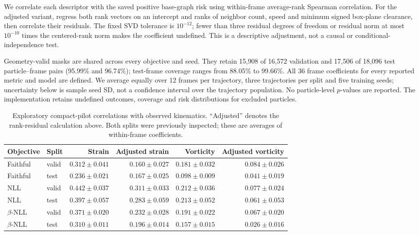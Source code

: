 We correlate each descriptor with the saved positive base-graph risk using
within-frame average-rank Spearman correlation. For the adjusted variant,
regress both rank vectors on an intercept and ranks of neighbor count,
speed and minimum signed box-plane clearance, then correlate their residuals.
The fixed SVD tolerance is $10^{-12}$; fewer than three residual degrees of
freedom or residual norm at most $10^{-10}$ times the centered-rank norm
makes the coefficient undefined. This is a descriptive adjustment, not a
causal or conditional-independence test.

Geometry-valid masks are shared across every objective and seed. They retain
15,908 of 16,572 validation and 17,506 of 18,096 test particle--frame pairs
(95.99\% and 96.74\%); test-frame coverage ranges from 88.05\% to 99.66\%.
All 36 frame coefficients for every reported metric and model are defined.
We average equally over 12 frames per trajectory, three trajectories per
split and five training seeds; uncertainty below is sample seed SD, not a
confidence interval over the trajectory population. No particle-level
$p$-values are reported. The implementation retains undefined outcomes,
coverage and risk distributions for excluded particles.

\begin{table}[ht]
\centering\small
\caption{Exploratory compact-pilot correlations with observed kinematics.
``Adjusted'' denotes the rank-residual calculation above. Both splits were
previously inspected; these are averages of within-frame coefficients.}
\label{tab:physical-rank}
\begin{tabular}{llrrrr}
\toprule
Objective & Split & Strain & Adjusted strain & Vorticity & Adjusted vorticity\\
\midrule
Faithful & valid & $0.312\pm0.041$ & $0.160\pm0.027$ & $0.181\pm0.032$ & $0.084\pm0.026$\\
Faithful & test & $0.236\pm0.021$ & $0.167\pm0.025$ & $0.098\pm0.009$ & $0.041\pm0.019$\\
NLL & valid & $0.442\pm0.037$ & $0.311\pm0.033$ & $0.212\pm0.036$ & $0.077\pm0.024$\\
NLL & test & $0.397\pm0.057$ & $0.283\pm0.059$ & $0.213\pm0.052$ & $0.061\pm0.053$\\
$\beta$-NLL & valid & $0.371\pm0.020$ & $0.232\pm0.028$ & $0.191\pm0.022$ & $0.067\pm0.020$\\
$\beta$-NLL & test & $0.310\pm0.011$ & $0.196\pm0.014$ & $0.157\pm0.015$ & $0.026\pm0.016$\\
\bottomrule
\end{tabular}
\end{table}


